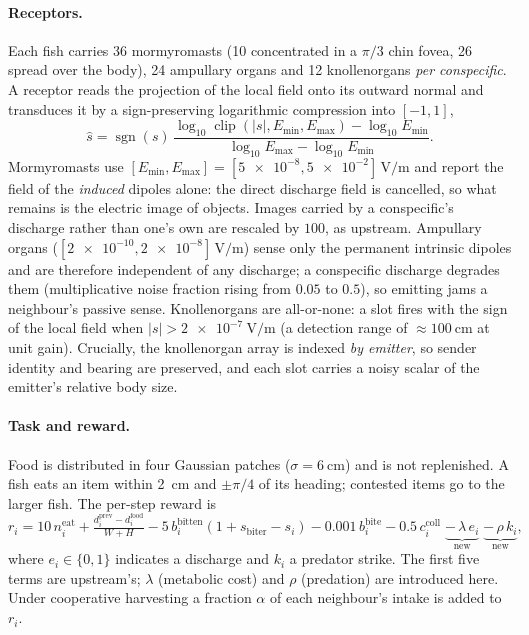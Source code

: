 \paragraph{Receptors.}
Each fish carries 36 mormyromasts (10 concentrated in a $\pi/3$ chin fovea, 26
spread over the body), 24 ampullary organs and 12 knollenorgans \emph{per
conspecific}. A receptor reads the projection of the local field onto its outward
normal and transduces it by a sign-preserving logarithmic compression into
$[-1,1]$,
\begin{equation}
\hat{s} = \operatorname{sgn}(s)\,
\frac{\log_{10}\operatorname{clip}(|s|,E_{\min},E_{\max}) - \log_{10}E_{\min}}
     {\log_{10}E_{\max}-\log_{10}E_{\min}} .
\end{equation}
Mormyromasts use $[E_{\min},E_{\max}]=[\num{5e-8},\num{5e-2}]\,\si{\volt\per\metre}$
and report the field of the \emph{induced} dipoles alone: the direct discharge
field is cancelled, so what remains is the electric image of objects. Images
carried by a conspecific's discharge rather than one's own are rescaled by
$\num{100}$, as upstream. Ampullary organs
($[\num{2e-10},\num{2e-8}]\,\si{\volt\per\metre}$) sense only the permanent
intrinsic dipoles and are therefore independent of any discharge; a conspecific
discharge degrades them (multiplicative noise fraction rising from $0.05$ to
$0.5$), so emitting jams a neighbour's passive sense. Knollenorgans are
all-or-none: a slot fires with the sign of the local field when
$|s|>\SI{2e-7}{\volt\per\metre}$ (a detection range of $\approx\SI{100}{\centi\metre}$
at unit gain). Crucially, the knollenorgan array is indexed \emph{by emitter}, so
sender identity and bearing are preserved, and each slot carries a noisy scalar
of the emitter's relative body size.

\paragraph{Task and reward.}
Food is distributed in four Gaussian patches ($\sigma=\SI{6}{\centi\metre}$) and
is not replenished. A fish eats an item within \SI{2}{\centi\metre} and $\pm\pi/4$
of its heading; contested items go to the larger fish. The per-step reward is
\begin{equation}
r_i = 10\,n^{\text{eat}}_i
 + \tfrac{d^{\text{prev}}_i-d^{\text{food}}_i}{W+H}
 - 5\,b^{\text{bitten}}_i(1+s_{\text{biter}}-s_i)
 - 0.001\,b^{\text{bite}}_i
 - 0.5\,c^{\text{coll}}_i
 \;\underbrace{-\,\lambda\,e_i}_{\text{new}}
 \;\underbrace{-\,\rho\,k_i}_{\text{new}},
\end{equation}
where $e_i\in\{0,1\}$ indicates a discharge and $k_i$ a predator strike. The first
five terms are upstream's; $\lambda$ (metabolic cost) and $\rho$ (predation) are
introduced here. Under cooperative harvesting a fraction $\alpha$ of each
neighbour's intake is added to $r_i$.

